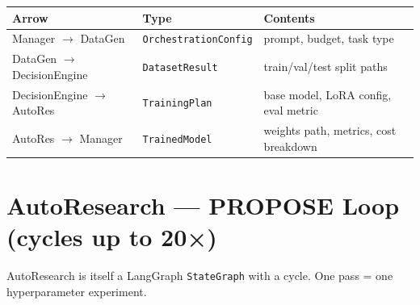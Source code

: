 \documentclass[11pt, letterpaper]{article}
\begin{document}
\vspace{0.5em}
\begin{center}
\begin{tabular}{lll}
\hline
\textbf{Arrow} & \textbf{Type} & \textbf{Contents} \\
\hline
Manager $\to$ DataGen        & \texttt{OrchestrationConfig} & prompt, budget, task type \\
DataGen $\to$ DecisionEngine & \texttt{DatasetResult}       & train/val/test split paths \\
DecisionEngine $\to$ AutoRes & \texttt{TrainingPlan}        & base model, LoRA config, eval metric \\
AutoRes $\to$ Manager        & \texttt{TrainedModel}        & weights path, metrics, cost breakdown \\
\hline
\end{tabular}
\end{center}

\section{AutoResearch — PROPOSE Loop (cycles up to 20×)}

AutoResearch is itself a LangGraph \texttt{StateGraph} with a cycle.
One pass = one hyperparameter experiment.
\end{document}
